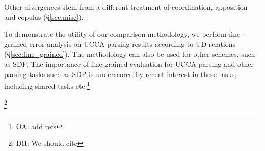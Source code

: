 \documentclass[11pt,a4paper]{article}
\newcommand{\oa}[1]{\footnote{\color{red}OA: #1}}
\newcommand{\daniel}[1]{\footnote{\color{blue}DH: #1}}
\begin{document}
   Other divergences stem from a different treatment of coordination, apposition and copulas (\S\ref{sec:misc}).
  
  
  To demonstrate the utility of our comparison methodology,
  we perform fine-grained error analysis on UCCA parsing results
  according to UD relations (\S\ref{sec:fine_grained}).
  The methodology can also be used for other schemes, such as SDP.
  The importance of fine grained evaluation for UCCA parsing and other parsing tasks
  such as SDP is underscored by recent interest in these tasks, including shared tasks etc.\oa{add refs}



\daniel{We should cite }

\end{document}
